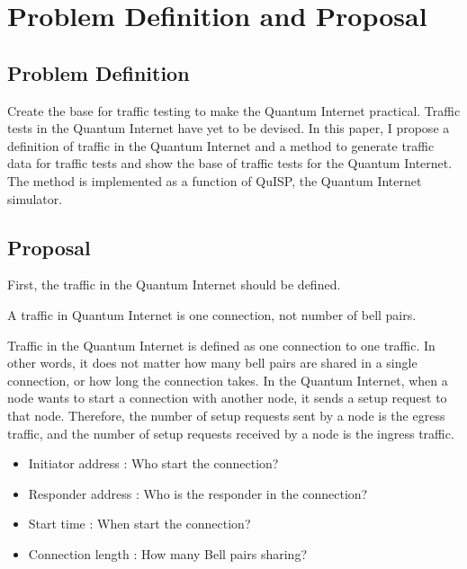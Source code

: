 \chapter{Problem Definition and Proposal}
\label{problem_definition_and_proposal}

\section{Problem Definition}
Create the base for traffic testing to make the Quantum Internet practical. 
Traffic tests in the Quantum Internet have yet to be devised. 
In this paper, I propose a definition of traffic in the Quantum Internet and a method to generate traffic data for traffic tests and show the base of traffic tests for the Quantum Internet.
The method is implemented as a function of QuISP, the Quantum Internet simulator.

\section{Proposal}
First, the traffic in the Quantum Internet should be defined. 
\begin{screen}
    \begin{dfn}
        A traffic in Quantum Internet is one connection, not number of bell pairs.
    \end{dfn}
\end{screen}

Traffic in the Quantum Internet is defined as one connection to one traffic. 
In other words, it does not matter how many bell pairs are shared in a single connection, or how long the connection takes.
In the Quantum Internet, when a node wants to start a connection with another node, it sends a setup request to that node.
Therefore, the number of setup requests sent by a node is the egress traffic, and the number of setup requests received by a node is the ingress traffic.

\begin{itemize}
    \item Initiator address : Who start the connection?
    \item Responder address : Who is the responder in the connection?
    \item Start time : When start the connection?
    \item Connection length : How many Bell pairs sharing?
\end{itemize}


